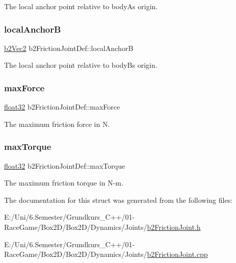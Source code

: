The local anchor point relative to bodyA\textquotesingle{}s origin. 

\mbox{\label{structb2_friction_joint_def_ad6d5a5614a7ac77b13e53fda3e32ed05}} 
\subsubsection{\texorpdfstring{localAnchorB}{localAnchorB}}
{\footnotesize\ttfamily \mbox{\hyperlink{structb2_vec2}{b2\+Vec2}} b2\+Friction\+Joint\+Def\+::local\+AnchorB}



The local anchor point relative to bodyB\textquotesingle{}s origin. 

\mbox{\label{structb2_friction_joint_def_ad30e97a80790d4ca64bac7a1fa7d1b35}} 
\subsubsection{\texorpdfstring{maxForce}{maxForce}}
{\footnotesize\ttfamily \mbox{\hyperlink{b2_settings_8h_aacdc525d6f7bddb3ae95d5c311bd06a1}{float32}} b2\+Friction\+Joint\+Def\+::max\+Force}



The maximum friction force in N. 

\mbox{\label{structb2_friction_joint_def_a61adfb0ee7c0ed4cb8feee8304c16ef6}} 
\subsubsection{\texorpdfstring{maxTorque}{maxTorque}}
{\footnotesize\ttfamily \mbox{\hyperlink{b2_settings_8h_aacdc525d6f7bddb3ae95d5c311bd06a1}{float32}} b2\+Friction\+Joint\+Def\+::max\+Torque}



The maximum friction torque in N-\/m. 



The documentation for this struct was generated from the following files\+:\begin{DoxyCompactItemize}
\item 
E\+:/\+Uni/6.\+Semester/\+Grundkurs\+\_\+\+C++/01-\/\+Race\+Game/\+Box2\+D/\+Box2\+D/\+Dynamics/\+Joints/\mbox{\hyperlink{b2_friction_joint_8h}{b2\+Friction\+Joint.\+h}}\item 
E\+:/\+Uni/6.\+Semester/\+Grundkurs\+\_\+\+C++/01-\/\+Race\+Game/\+Box2\+D/\+Box2\+D/\+Dynamics/\+Joints/\mbox{\hyperlink{b2_friction_joint_8cpp}{b2\+Friction\+Joint.\+cpp}}\end{DoxyCompactItemize}
